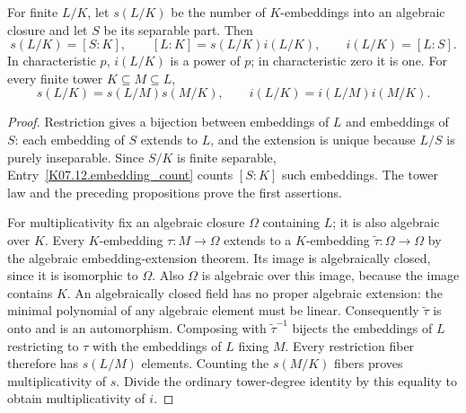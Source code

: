 \begin{theorem}
For finite $L/K$, let $s(L/K)$ be the number of $K$-embeddings into an algebraic closure and let $S$ be its separable part. Then
\[
s(L/K)=[S:K],\qquad [L:K]=s(L/K)i(L/K),\qquad i(L/K)=[L:S].
\]
In characteristic $p$, $i(L/K)$ is a power of $p$; in characteristic zero it is one. For every finite tower $K\subseteq M\subseteq L$,
\[
s(L/K)=s(L/M)s(M/K),\qquad i(L/K)=i(L/M)i(M/K).
\]
\end{theorem}
\begin{proof}
Restriction gives a bijection between embeddings of $L$ and embeddings of $S$: each embedding of $S$ extends to $L$, and the extension is unique because $L/S$ is purely inseparable. Since $S/K$ is finite separable, Entry~\ref{K07.12.embedding_count} counts $[S:K]$ such embeddings. The tower law and the preceding propositions prove the first assertions.

For multiplicativity fix an algebraic closure $\Omega$ containing $L$; it is also algebraic over $K$. Every $K$-embedding $\tau:M\to\Omega$ extends to a $K$-embedding $\widetilde\tau:\Omega\to\Omega$ by the algebraic embedding-extension theorem. Its image is algebraically closed, since it is isomorphic to $\Omega$. Also $\Omega$ is algebraic over this image, because the image contains $K$. An algebraically closed field has no proper algebraic extension: the minimal polynomial of any algebraic element must be linear. Consequently $\widetilde\tau$ is onto and is an automorphism. Composing with $\widetilde\tau^{-1}$ bijects the embeddings of $L$ restricting to $\tau$ with the embeddings of $L$ fixing $M$. Every restriction fiber therefore has $s(L/M)$ elements. Counting the $s(M/K)$ fibers proves multiplicativity of $s$. Divide the ordinary tower-degree identity by this equality to obtain multiplicativity of $i$.
\end{proof}

